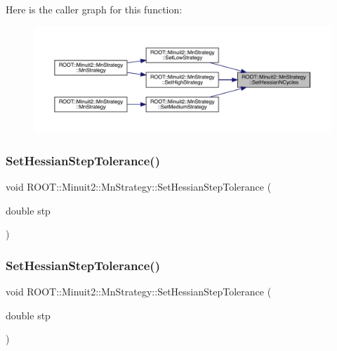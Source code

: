 Here is the caller graph for this function\+:\nopagebreak
\begin{figure}[H]
\begin{center}
\leavevmode
\includegraphics[width=350pt]{da/de4/classROOT_1_1Minuit2_1_1MnStrategy_a7d97d197e18c686e2cdb826ea514de28_icgraph}
\end{center}
\end{figure}
\mbox{\label{classROOT_1_1Minuit2_1_1MnStrategy_a8711f7c9983983c83fd5d192bc9304f7}} 
\subsubsection{\texorpdfstring{SetHessianStepTolerance()}{SetHessianStepTolerance()}\hspace{0.1cm}{\footnotesize\ttfamily [1/2]}}
{\footnotesize\ttfamily void R\+O\+O\+T\+::\+Minuit2\+::\+Mn\+Strategy\+::\+Set\+Hessian\+Step\+Tolerance (\begin{DoxyParamCaption}\item[{double}]{stp }\end{DoxyParamCaption})\hspace{0.3cm}{\ttfamily [inline]}}

\mbox{\label{classROOT_1_1Minuit2_1_1MnStrategy_a8711f7c9983983c83fd5d192bc9304f7}} 
\subsubsection{\texorpdfstring{SetHessianStepTolerance()}{SetHessianStepTolerance()}\hspace{0.1cm}{\footnotesize\ttfamily [2/2]}}
{\footnotesize\ttfamily void R\+O\+O\+T\+::\+Minuit2\+::\+Mn\+Strategy\+::\+Set\+Hessian\+Step\+Tolerance (\begin{DoxyParamCaption}\item[{double}]{stp }\end{DoxyParamCaption})\hspace{0.3cm}{\ttfamily [inline]}}

